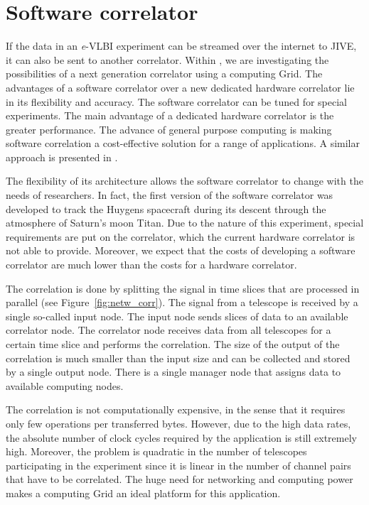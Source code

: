 \section{Software correlator}\label{sec:vlbi}
If the data in an {\it e}-VLBI experiment can be streamed over the
internet to JIVE, it can also be sent to another correlator. Within
\scarie, we are investigating the possibilities of a next generation
correlator using a computing Grid. The advantages of a software
correlator over a new dedicated hardware correlator lie in its
flexibility and accuracy. The software correlator can be tuned for
special experiments. The main advantage of a dedicated hardware
correlator is the greater performance. The advance of general purpose
computing is making software correlation a cost-effective solution for
a range of applications. A similar approach is presented in
\cite{deller-2007}.

The flexibility of its architecture allows the software correlator to
change with the needs of researchers. In fact, the first version of
the software correlator was developed to track the Huygens spacecraft
during its descent through the atmosphere of Saturn's moon Titan. Due
to the nature of this experiment, special requirements are put on the
correlator, which the current hardware correlator is not able to
provide.  Moreover, we expect that the costs of developing a software
correlator are much lower than the costs for a hardware correlator.

The correlation is done by splitting the signal in time slices that
are processed in parallel (see Figure~\ref{fig:netw_corr}). The signal
from a telescope is received by a single so-called input node.  The
input node sends slices of data to an available correlator node. The
correlator node receives data from all telescopes for a certain time
slice and performs the correlation. The size of the output of the
correlation is much smaller than the input size and can be collected
and stored by a single output node.  There is a single manager node
that assigns data to available computing nodes.

The correlation is not computationally expensive, in the sense that it
requires only few operations per transferred bytes. However, due to
the high data rates, the absolute number of clock cycles required by
the application is still extremely high. Moreover, the problem is
quadratic in the number of telescopes participating in the experiment
since it is linear in the number of channel pairs that have to be
correlated. The huge need for networking and computing power makes a
computing Grid an ideal platform for this application.


